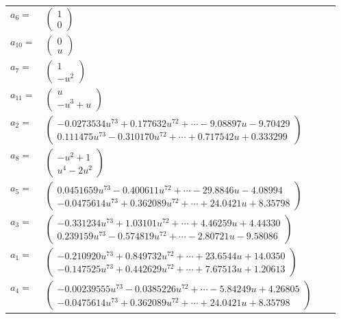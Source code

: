 \documentclass[1p]{elsarticle_modified}
\theoremstyle{definition}
\begin{document}
\begin{tabular}{m{7pt} m{180pt} m{7pt} m{180pt} }
\flushright $a_{6}=$&$\begin{pmatrix}1\\0\end{pmatrix}$ \\
\flushright $a_{10}=$&$\begin{pmatrix}0\\u\end{pmatrix}$ \\
\flushright $a_{7}=$&$\begin{pmatrix}1\\- u^2\end{pmatrix}$ \\
\flushright $a_{11}=$&$\begin{pmatrix}u\\- u^3+u\end{pmatrix}$ \\
\flushright $a_{2}=$&$\begin{pmatrix}-0.0273534 u^{73}+0.177632 u^{72}+\cdots-9.08897 u-9.70429\\0.111475 u^{73}-0.310170 u^{72}+\cdots+0.717542 u+0.333299\end{pmatrix}$ \\
\flushright $a_{8}=$&$\begin{pmatrix}- u^2+1\\u^4-2 u^2\end{pmatrix}$ \\
\flushright $a_{5}=$&$\begin{pmatrix}0.0451659 u^{73}-0.400611 u^{72}+\cdots-29.8846 u-4.08994\\-0.0475614 u^{73}+0.362089 u^{72}+\cdots+24.0421 u+8.35798\end{pmatrix}$ \\
\flushright $a_{3}=$&$\begin{pmatrix}-0.331234 u^{73}+1.03101 u^{72}+\cdots+4.46259 u+4.44330\\0.239159 u^{73}-0.574819 u^{72}+\cdots-2.80721 u-9.58086\end{pmatrix}$ \\
\flushright $a_{1}=$&$\begin{pmatrix}-0.210920 u^{73}+0.849732 u^{72}+\cdots+23.6544 u+14.0350\\-0.147525 u^{73}+0.442629 u^{72}+\cdots+7.67513 u+1.20613\end{pmatrix}$ \\
\flushright $a_{4}=$&$\begin{pmatrix}-0.00239555 u^{73}-0.0385226 u^{72}+\cdots-5.84249 u+4.26805\\-0.0475614 u^{73}+0.362089 u^{72}+\cdots+24.0421 u+8.35798\end{pmatrix}$ \\

\end{tabular}
\end{document}
